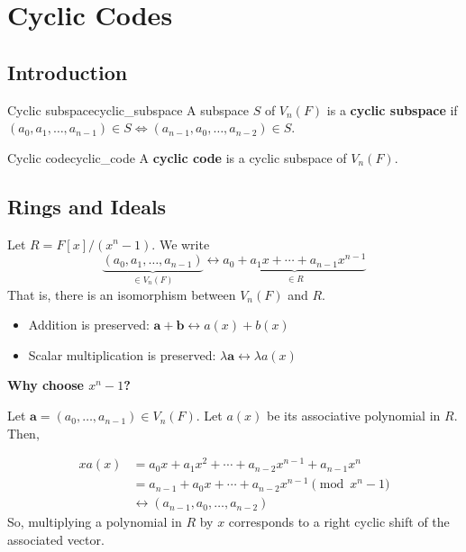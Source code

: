 \chapter{Cyclic Codes}
\section{Introduction}

\begin{Definition}{Cyclic subspace}{cyclic_subspace}
    A subspace $ S $ of $ V_n(F) $ is a \textbf{cyclic subspace}
    if $ (a_0,a_1,\ldots ,a_{n-1})\in S\iff
        (a_{n-1},a_0,\ldots , a_{n-2})\in S $.
\end{Definition}

\begin{Definition}{Cyclic code}{cyclic_code}
    A \textbf{cyclic code} is a cyclic subspace of $ V_n(F) $.
\end{Definition}

\section{Rings and Ideals}

Let $ R=F[x]/(x^n-1) $. We write
\[ \underbrace{(a_0,a_1,\ldots ,a_{n-1})}_{\in V_n(F)}
    \longleftrightarrow \underbrace{{a_0+a_1x+\cdots+a_{n-1}}x^{n-1}}_{\in R} \]
That is, there is an isomorphism between $ V_n(F) $ and $ R $.
\begin{itemize}
    \item Addition is preserved: $ \symbf{a}+\symbf{b}\longleftrightarrow a(x)+b(x) $
    \item Scalar multiplication is preserved: $ \lambda\symbf{a} \longleftrightarrow \lambda a(x) $
\end{itemize}
\textbf{Why choose $ x^n -1$?}

Let $ \symbf{a}=(a_0,\ldots ,a_{n-1})\in V_n(F) $. Let $ a(x) $ be its associative
polynomial in $ R $. Then,

\begin{align*}
    x a(x)
     & =a_0x+a_1x^2+\cdots+a_{n-2}x^{n-1}+a_{n-1}x^n     \\
     & =a_{n-1}+a_0x+\cdots+a_{n-2}x^{n-1} \pmod{x^n -1} \\
     & \longleftrightarrow (a_{n-1},a_0,\ldots ,a_{n-2})
\end{align*}
So, multiplying a polynomial in $ R $ by $ x $ corresponds
to a right cyclic shift of the associated vector.

